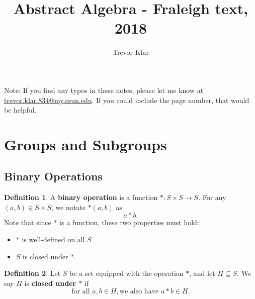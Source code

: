 \documentclass[a5paper]{article}
\title{Abstract Algebra - Fraleigh text, 2018}
\author{Trevor Klar}
\theoremstyle{definition}%
\newtheorem*{definition*}{Definition}
\numberwithin{exercise}{section}
\theoremstyle{remark}%
\begin{document}
\maketitle

\tableofcontents


\begin{highlight}
Note: If you find any typos in these notes, please let me know at \\ \href{mailto:trevor.klar.834@my.csun.edu}{trevor.klar.834@my.csun.edu}. If you could include the page number, that would be helpful. 

\end{highlight}

\pagebreak
\section{Groups and Subgroups}

\subsection{Binary Operations}

\begin{highlight}
\begin{definition*}
A \textbf{binary operation} is a function $*:S\times S\to S$. For any $(a,b)\in S\times S$, we notate $*(a,b)$ as 
$$a*b.$$
Note that since $*$ is a function, these two properties must hold:
\begin{itemize}
\item $*$ is well-defined on all $S$
\item $S$ is closed under $*$. 
\end{itemize} 
\end{definition*}
\end{highlight}

\begin{highlight}
\begin{definition*}
Let $S$ be a set equipped with the operation $*$, and let $H\subseteq S$. We say $H$ is \textbf{closed under $*$} if
$$\text{for all } a,b\in H, \text{we also have } a*b\in H.$$
\end{definition*}
\end{highlight}
\end{document}
